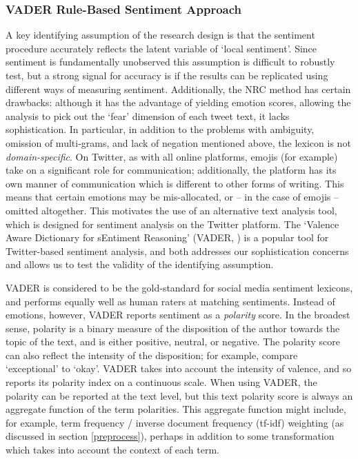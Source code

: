 \documentclass[12pt,a4]{article}
\begin{document}
\subsubsection{VADER Rule-Based Sentiment Approach}\label{vader}
A key identifying assumption of the research design is that the sentiment procedure accurately reflects the latent variable of `local sentiment'. Since sentiment is fundamentally unobserved this assumption is difficult to robustly test, but a strong signal for accuracy is if the results can be replicated using different ways of measuring sentiment. Additionally, the NRC method has certain drawbacks: although it has the advantage of yielding emotion scores, allowing the analysis to pick out the `fear' dimension of each tweet text, it lacks sophistication. In particular, in addition to the problems with ambiguity, omission of multi-grams, and lack of negation mentioned above, the lexicon is not \textit{domain-specific}. On Twitter, as with all online platforms, emojis (for example) take on a significant role for communication; additionally, the platform has its own manner of communication which is different to other forms of writing. This means that certain emotions may be mis-allocated, or -- in the case of emojis -- omitted altogether. This motivates the use of an alternative text analysis tool, which is designed for sentiment analysis on the Twitter platform. The `Valence Aware Dictionary for sEntiment Reasoning' (VADER, \textcite{huttoVaderParsimoniousRulebased2014}) is a popular tool for Twitter-based sentiment analysis, and both addresses our sophistication concerns and allows us to test the validity of the identifying assumption.

VADER is considered to be the gold-standard for social media sentiment lexicons, and performs equally well as human raters at matching sentiments. Instead of emotions, however, VADER reports sentiment as a \textit{polarity} score. In the broadest sense, polarity is a binary measure of the disposition of the author towards the topic of the text, and is either positive, neutral, or negative. The polarity score can also reflect the intensity of the disposition; for example, compare `exceptional' to `okay'. VADER takes into account the intensity of valence, and so reports its polarity index on a continuous scale. When using VADER, the polarity can be reported at the text level, but this text polarity score is always an aggregate function of the term polarities. This aggregate function might include, for example, term frequency / inverse document frequency (tf-idf) weighting (as discussed in section \ref{preprocess}), perhaps in addition to some transformation which takes into account the context of each term.
\end{document}

